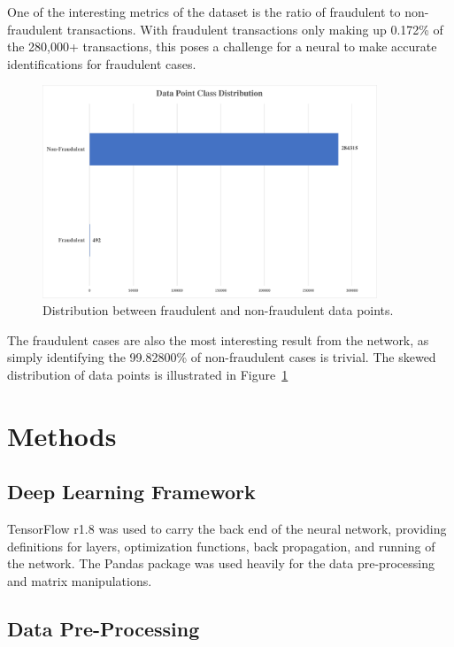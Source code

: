 \documentclass{article}
\begin{document}
 One of the interesting metrics of the dataset is the ratio of fraudulent to non-fraudulent transactions. 
 With fraudulent transactions only making up 0.172\% of the 280,000+ transactions, this poses a 
 challenge for a neural to make accurate identifications for fraudulent cases. 

\begin{figure}
  \begin{center}
    \includegraphics[width=100mm]{DataDistribution.pdf}
    \caption{Distribution between fraudulent and non-fraudulent data points.}
    \label{data-distribution}
  \end{center}
\end{figure}

 The fraudulent cases are also the most interesting result from the network, as simply identifying the 
 99.82800\% of non-fraudulent cases is trivial. The skewed distribution of data points is illustrated
 in Figure~\ref{data-distribution}


\section{Methods}


\subsection{Deep Learning Framework}

 TensorFlow r1.8 was used to carry the back end of the neural network, providing definitions
 for layers, optimization functions, back propagation, and running of the network. The Pandas 
 package was used heavily for the data pre-processing and matrix manipulations.

\subsection{Data Pre-Processing}
\end{document}
